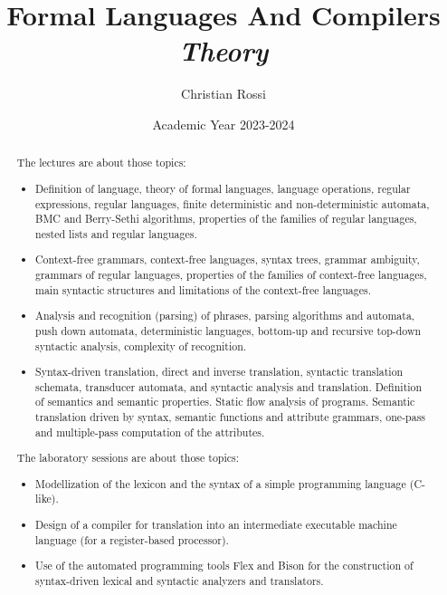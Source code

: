 \documentclass[12pt, a4paper]{report}
\title{Formal Languages And Compilers \\ \textit{Theory}}
\author{Christian Rossi}
\date{Academic Year 2023-2024}
\newtheorem[style=M,bodystyle=\normalfont]{theorem}{Theorem}
\newtheorem[style=M,bodystyle=\normalfont]{corollary}{Corollary}
\newtheorem[style=M,bodystyle=\normalfont]{lemma}{Lemma}
\newtheorem[style=M,bodystyle=\normalfont]{definition}{Definition}
\begin{document}
\maketitle

\newpage

\begin{abstract}
    The lectures are about those topics: 
    \begin{itemize}
        \item Definition of language, theory of formal languages, language operations, regular expressions, regular languages, finite deterministic and non-deterministic automata, 
            BMC and Berry-Sethi algorithms, properties of the families of regular languages, nested lists and regular languages.
        \item Context-free grammars, context-free languages, syntax trees, grammar ambiguity, grammars of regular languages, properties of the families of context-free languages, 
            main syntactic structures and limitations of the context-free languages.
        \item Analysis and recognition (parsing) of phrases, parsing algorithms and automata, push down automata, deterministic languages, bottom-up and recursive top-down syntactic 
            analysis, complexity of recognition.
        \item Syntax-driven translation, direct and inverse translation, syntactic translation schemata, transducer automata, and syntactic analysis and translation. Definition of 
            semantics and semantic properties. Static flow analysis of programs. Semantic translation driven by syntax, semantic functions and attribute grammars, one-pass and 
            multiple-pass computation of the attributes.
    \end{itemize}
    The laboratory sessions are about those topics: 
    \begin{itemize}
        \item Modellization of the lexicon and the syntax of a simple programming language (C-like).
        \item Design of a compiler for translation into an intermediate executable machine language (for a register-based processor).
        \item Use of the automated programming tools Flex and Bison for the construction of syntax-driven lexical and syntactic analyzers and translators.
    \end{itemize}
\end{abstract}
\end{document}
